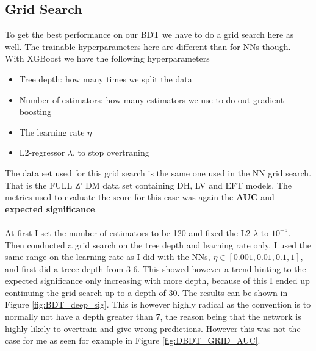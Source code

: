 \documentclass[14pt, a4paper]{book}
\begin{document}



\subsection{Grid Search}\label{sec:BDTGriddy}
To get the best performance on our BDT we have to do a grid search here as well. The trainable hyperparameters here are different than for NNs though. 
With XGBoost we have the following hyperparameters
\begin{itemize}
   \item Tree depth: how many times we split the data
   \item Number of estimators: how many estimators we use to do out gradient boosting 
   \item The learning rate $\eta$
   \item L2-regressor $\lambda$, to stop overtraning
\end{itemize}
The data set used for this grid search is the same one used in the NN grid search. That is the FULL Z' DM data set containing DH, LV and EFT models. 
The metrics used to evaluate the score for this case was again the \textbf{AUC} and \textbf{expected significance}.\\
\\At first I set the number of estimators to be 120 and fixed the L2 $\lambda$ to $10^{-5}$. Then conducted a grid search on the tree depth and learning rate only. 
I used the same range on the learning rate as I did with the NNs, $\eta \in [0.001, 0.01, 0.1, 1]$, and first did a treee depth from 3-6. 
This showed however a trend hinting to the expected significance only increasing with more depth, because of this I ended up continuing the grid search up to a depth of 30.
The results can be shown in Figure \ref{fig:BDT_deep_sig}. This is however highly radical as the convention is to normally not have a depth greater than 7, 
the reason being that the network is highly likely to overtrain and give wrong predictions. However this was not the case for me as seen for example in Figure \ref{fig:DBDT_GRID_AUC}.
\end{document}
